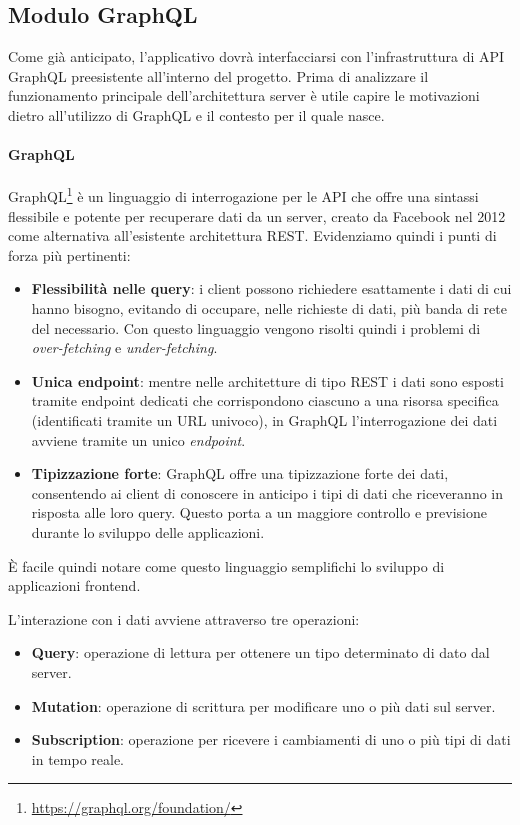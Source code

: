 \subsection{Modulo GraphQL}
Come già anticipato, l'applicativo dovrà interfacciarsi con l'infrastruttura di API GraphQL preesistente all'interno del progetto. 
Prima di analizzare il funzionamento principale dell'architettura server è utile capire le motivazioni dietro all'utilizzo di GraphQL e il contesto per il quale nasce.

\paragraph{GraphQL}
  GraphQL\footnote{\url{https://graphql.org/foundation/}} è un linguaggio di interrogazione per le \ac{API} che offre una sintassi flessibile e potente per recuperare dati da un server, creato da Facebook nel 2012 come alternativa all'esistente architettura \ac{REST}. Evidenziamo quindi i punti di forza più pertinenti:
\begin{itemize}
	\item \textbf{Flessibilità nelle query}: i client possono richiedere esattamente i dati di cui hanno bisogno, evitando di occupare, nelle richieste di dati, più banda di rete del necessario. Con questo linguaggio vengono risolti quindi i problemi di \textit{over-fetching} e \textit{under-fetching}.
	\item \textbf{Unica endpoint}:  mentre nelle architetture di tipo \ac{REST} i dati sono esposti tramite endpoint dedicati che corrispondono ciascuno a una risorsa specifica (identificati tramite un \ac{URL} univoco), in GraphQL l'interrogazione dei dati avviene tramite un unico \textit{endpoint}.
	\item \textbf{Tipizzazione forte}: GraphQL offre una tipizzazione forte dei dati, consentendo ai client di conoscere in anticipo i tipi di dati che riceveranno in risposta alle loro query. Questo porta a un maggiore controllo e previsione durante lo sviluppo delle applicazioni.
\end{itemize}
È facile quindi notare come questo linguaggio semplifichi lo sviluppo di applicazioni frontend.

L'interazione con i dati avviene attraverso tre operazioni: 
\begin{itemize}
	\item \textbf{Query}: operazione di lettura per ottenere un tipo determinato di dato dal server.
	\item \textbf{Mutation}:  operazione di scrittura per modificare uno o più dati sul server.
	\item \textbf{Subscription}: operazione per ricevere i cambiamenti di uno o più tipi di dati in tempo reale.
\end{itemize}

